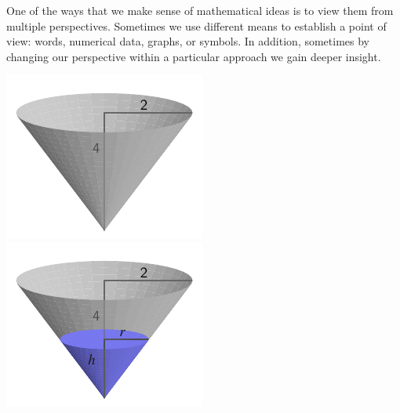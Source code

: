 \documentclass{ximera}
\begin{document}
One of the ways that we make sense of mathematical ideas is to view them from multiple perspectives.  Sometimes we use different means to establish a point of view:  words, numerical data, graphs, or symbols.  In addition, sometimes by changing our perspective within a particular approach we gain deeper insight.%

\begin{image}
\includegraphics{tandem-empty-conical-tank}
\includegraphics{tandem-filled-conical-tank}
\end{image}
\end{document}
